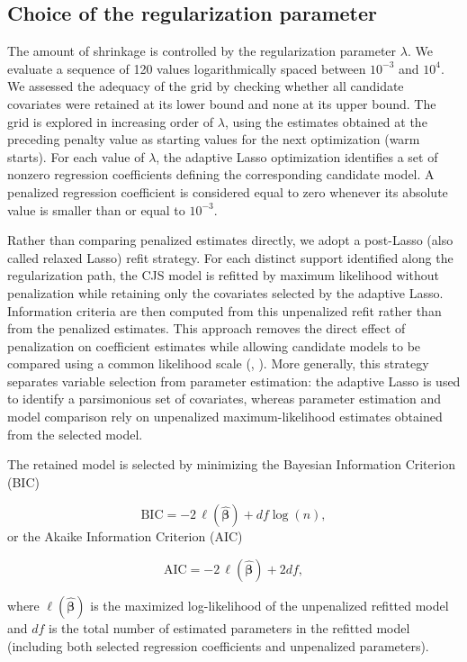 \documentclass[
  11pt,
  a4paper,
]{article}
\newcounter{none} %
\begin{document}
\subsection{Choice of the regularization parameter}\label{choice-of-the-regularization-parameter}

The amount of shrinkage is controlled by the regularization parameter \(\lambda\). We evaluate a sequence of 120 values logarithmically spaced between \(10^{-3}\) and \(10^4\). We assessed the adequacy of the grid by checking whether all candidate covariates were retained at its lower bound and none at its upper bound. The grid is explored in increasing order of \(\lambda\), using the estimates obtained at the preceding penalty value as starting values for the next optimization (warm starts). For each value of \(\lambda\), the adaptive Lasso optimization identifies a set of nonzero regression coefficients defining the corresponding candidate model. A penalized regression coefficient is considered equal to zero whenever its absolute value is smaller than or equal to \(10^{-3}\).

Rather than comparing penalized estimates directly, we adopt a post-Lasso (also called relaxed Lasso) refit strategy. For each distinct support identified along the regularization path, the CJS model is refitted by maximum likelihood without penalization while retaining only the covariates selected by the adaptive Lasso. Information criteria are then computed from this unpenalized refit rather than from the penalized estimates. This approach removes the direct effect of penalization on coefficient estimates while allowing candidate models to be compared using a common likelihood scale (, ). More generally, this strategy separates variable selection from parameter estimation: the adaptive Lasso is used to identify a parsimonious set of covariates, whereas parameter estimation and model comparison rely on unpenalized maximum-likelihood estimates obtained from the selected model.

The retained model is selected by minimizing the Bayesian Information Criterion (BIC)

\[
\mathrm{BIC}
=
-2\,\ell(\hat{\boldsymbol{\beta}})
+
df \log(n),
\]
or the Akaike Information Criterion (AIC)

\[
\mathrm{AIC}=-2\,\ell(\hat{\boldsymbol{\beta}}) + 2df,
\]

where \(\ell(\hat{\boldsymbol{\beta}})\) is the maximized log-likelihood of the unpenalized refitted model and \(df\) is the total number of estimated parameters in the refitted model (including both selected regression coefficients and unpenalized parameters).
\end{document}
